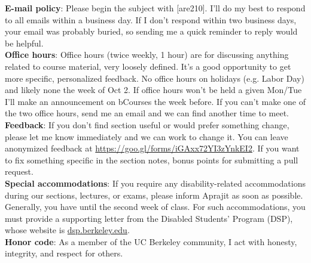 \documentclass[twoside]{article}
\begin{document}
	{\bf E-mail policy}: Please begin the subject with [are210]. I'll do my best to respond to all emails within a business day. If I don't respond within two business days, your email was probably buried, so sending me a quick reminder to reply would be helpful. \\
	
	{\bf Office hours}: Office hours (twice weekly, 1 hour) are for discussing anything related to course material, very loosely defined. It's a good opportunity to get more specific, personalized feedback. No office hours on holidays (e.g. Labor Day) and likely none the week of Oct 2. If office hours won't be held a given Mon/Tue I'll make an announcement on bCourses the week before. If you can't make one of the two office hours, send me an email and we can find another time to meet. \\
	
	{\bf Feedback}: If you don't find section useful or would prefer something change, please let me know immediately and we can work to change it. You can leave anonymized feedback at \href{https://goo.gl/forms/iGAxx72YI3zYnkEI2}{https://goo.gl/forms/iGAxx72YI3zYnkEI2}. If you want to fix something specific in the section notes, bonus points for submitting a pull request. \\
	
	{\bf Special accommodations}: If you require any disability-related accommodations during our sections, lectures, or exams, please inform Aprajit as soon as possible. Generally, you have until the second week of class. For such accommodations, you must provide a supporting letter from the Disabled Students' Program (DSP), whose website is \href{http://dsp.berkeley.edu}{dsp.berkeley.edu}. \\
	
	{\bf Honor code}: As a member of the UC Berkeley community, I act with honesty, integrity, and respect for others.
	
\end{document}
